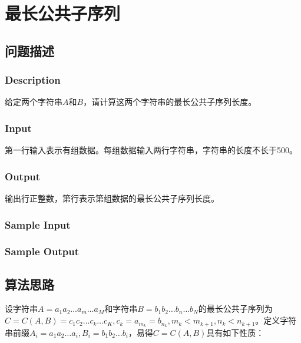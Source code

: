 \newpage
\section{最长公共子序列}
\subsection{问题描述}
\subsubsection*{Description}
给定两个字符串$A$和$B$，请计算这两个字符串的最长公共子序列长度。

\subsubsection*{Input}

第一行输入表示有组数据。每组数据输入两行字符串，字符串的长度不长于500。

\subsubsection*{Output}

输出行正整数，第行表示第组数据的最长公共子序列长度。

\subsubsection*{Sample Input}






\subsubsection*{Sample Output}



\subsection{算法思路}

设字符串$A=a_1a_2\dots a_m\dots a_M$和字符串$B=b_1b_2\dots b_n\dots b_N$的最长公共子序列为$C=C(A,B)=c_1c_2\dots c_k\dots c_K,c_k=a_{m_k}=b_{n_k},m_k<m_{k+1},n_k<n_{k+1}$。定义字符串前缀$A_i=a_1a_2\dots a_i,B_i=b_1b_2\dots b_i$，易得$C=C(A,B)$具有如下性质：

